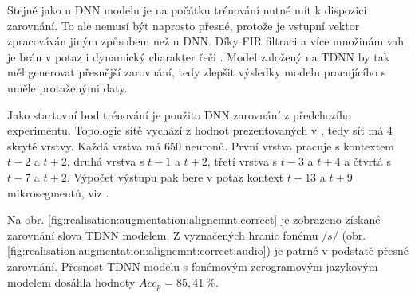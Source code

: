 
Stejně jako u DNN modelu je na počátku trénování nutné mít k dispozici zarovnání.
To ale nemusí být naprosto přesné, protože je vstupní vektor zpracováván jiným způsobem než u DNN.
Díky FIR filtraci a více množinám vah je brán v potaz i dynamický charakter řeči \cite{Peddinti2015}.
Model založený na TDNN by tak měl generovat přesnější zarovnání, tedy zlepšit výsledky modelu pracujícího s uměle protaženými daty.

Jako startovní bod trénování je použito DNN zarovnání z předchozího experimentu. Topologie sítě vychází z hodnot prezentovaných v \cite{Peddinti2015}, tedy síť má $4$ skryté vrstvy. Každá vrstva má 650 neuronů. První vrstva pracuje s kontextem $t-2$ a $t+2$, druhá vrstva s $t-1$ a $t+2$, třetí vrstva s $t-3$ a $t+4$ a čtvrtá s $t-7$ a $t+2$. Výpočet výstupu pak bere v potaz kontext $t-13$ a $t+9$ mikrosegmentů, viz \cite{Peddinti2015}.


Na obr. \ref{fig:realisation:augmentation:alignemnt:correct} je zobrazeno získané zarovnání slova  TDNN modelem.
Z vyznačených hranic fonému $/s/$ (obr. \ref{fig:realisation:augmentation:alignemnt:correct:audio}) je patrné v podstatě přesné zarovnání.
Přesnost TDNN modelu s fonémovým zerogramovým jazykovým modelem dosáhla hodnoty $Acc_{p}= 85,41\ \%$.

